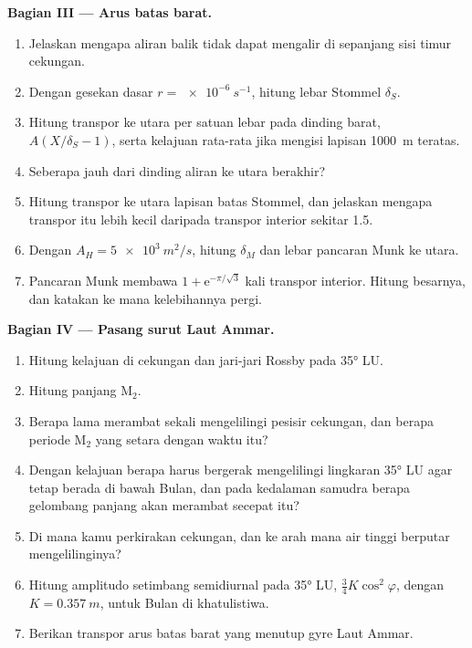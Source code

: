\begin{problem}
\medskip\noindent\textbf{Bagian III --- Arus batas barat.}
\begin{enumerate}[resume]
\item Jelaskan mengapa aliran balik tidak dapat mengalir di sepanjang sisi timur
  cekungan.
\item Dengan gesekan dasar $r = \qty{e-6}{s^{-1}}$, hitung
  lebar Stommel $\delta_S$.
\item Hitung transpor ke utara per satuan lebar pada dinding barat,
  $A(X/\delta_S - 1)$, serta kelajuan rata-rata jika mengisi lapisan
  \qty{1000}{m} teratas.
\item Seberapa jauh dari dinding aliran ke utara berakhir?
\item Hitung transpor ke utara lapisan batas Stommel, dan
  jelaskan mengapa transpor itu lebih kecil daripada transpor interior sekitar
  \qty{1.5}{\sverdrup}.
\item Dengan $A_H = \qty{5e3}{m^2/s}$, hitung $\delta_M$ dan lebar
  pancaran Munk ke utara.
\item Pancaran Munk membawa $1 + \mathrm e^{-\pi/\sqrt3}$ kali
  transpor interior. Hitung besarnya, dan katakan ke mana kelebihannya pergi.
\end{enumerate}

\medskip\noindent\textbf{Bagian IV --- Pasang surut Laut Ammar.}
\begin{enumerate}[resume]
\item Hitung kelajuan  di cekungan dan jari-jari Rossby
  pada \ang{35} LU.
\item Hitung panjang  M$_2$.
\item Berapa lama  merambat sekali mengelilingi pesisir
  cekungan, dan berapa periode M$_2$ yang setara dengan waktu itu?
\item Dengan kelajuan berapa  harus bergerak mengelilingi
  lingkaran \ang{35} LU agar tetap berada di bawah Bulan, dan pada kedalaman samudra berapa
  gelombang panjang akan merambat secepat itu?
\item Di mana kamu perkirakan  cekungan, dan ke arah mana
  air tinggi berputar mengelilinginya?
\item Hitung amplitudo setimbang semidiurnal pada \ang{35} LU, $\tfrac34
  K\cos^2\varphi$, dengan $K = \qty{0.357}{m}$, untuk Bulan di khatulistiwa.
\item Berikan transpor arus batas barat yang menutup
  gyre Laut Ammar.
\end{enumerate}
\end{problem}

